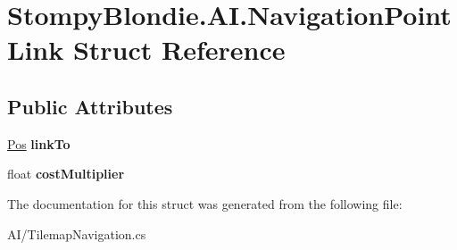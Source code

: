 \hypertarget{struct_stompy_blondie_1_1_a_i_1_1_navigation_point_link}{}\section{Stompy\+Blondie.\+A\+I.\+Navigation\+Point\+Link Struct Reference}
\label{struct_stompy_blondie_1_1_a_i_1_1_navigation_point_link}
\subsection*{Public Attributes}
\begin{DoxyCompactItemize}
\item 
\mbox{\label{struct_stompy_blondie_1_1_a_i_1_1_navigation_point_link_a2d4878d388b75a977b058b2c53725d82}} 
\mbox{\hyperlink{struct_stompy_blondie_1_1_common_1_1_types_1_1_pos}{Pos}} {\bfseries link\+To}
\item 
\mbox{\label{struct_stompy_blondie_1_1_a_i_1_1_navigation_point_link_a7f8895624ad0f818cf95e36c5cf2e10f}} 
float {\bfseries cost\+Multiplier}
\end{DoxyCompactItemize}


The documentation for this struct was generated from the following file\+:\begin{DoxyCompactItemize}
\item 
A\+I/Tilemap\+Navigation.\+cs\end{DoxyCompactItemize}
